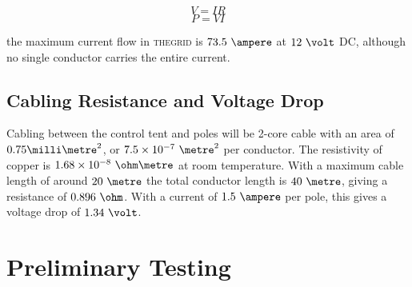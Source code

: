 \documentclass[12pt]{article} %
\newcommand{\thegrid}{\textsc{the\textperiodcentered grid}\xspace}
\begin{document}
\begin{appendices}
$$ V = IR $$
$$ P = VI $$

the maximum current flow in \thegrid is $73.5~\ampere$ at $12~\volt$ DC,
although no single conductor carries the entire current.

\subsection{Cabling Resistance and Voltage Drop}
\label{app:cabledrop}
Cabling between the control tent and poles will be 2-core cable with an area of
$0.75\milli\metre^2$, or $7.5 \times 10^{-7}~\metre^2$ per conductor.  The
resistivity of copper is $1.68 \times 10^{-8}~\ohm\metre$ at room temperature.
With a maximum cable length of around $20~\metre$ the total conductor length is
$40~\metre$, giving a resistance of $0.896~\ohm$.  With a current of
$1.5~\ampere$ per pole, this gives a voltage drop of $1.34~\volt$.

\section{Preliminary Testing}

\end{appendices}
\end{document}
